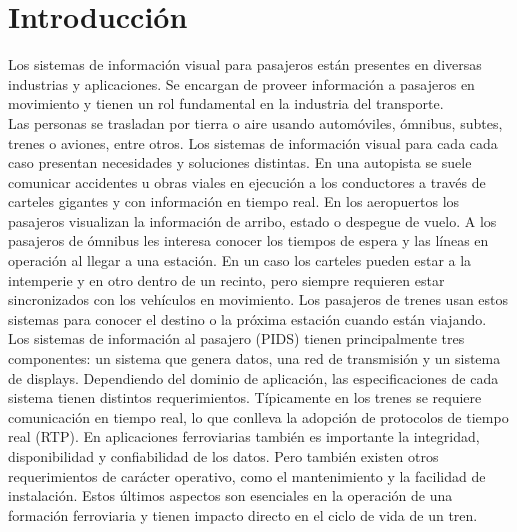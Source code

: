 
\newcommand{\keyword}[1]{\textbf{#1}}
\newcommand{\tabhead}[1]{\textbf{#1}}
\newcommand{\code}[1]{\texttt{#1}}
\newcommand{\file}[1]{\texttt{\bfseries#1}}
\newcommand{\option}[1]{\texttt{\itshape#1}}
\newcommand{\grados}{$^{\circ}$}



\chapter{Introducción} %
\label{Chapter1} %
\label{Intro}

Los sistemas de información visual para pasajeros están presentes en diversas industrias y aplicaciones. Se encargan de proveer información a pasajeros en  movimiento y tienen un rol fundamental en la industria del transporte.\\

 Las personas se trasladan por tierra o aire usando automóviles, ómnibus, subtes, trenes o aviones, entre otros. Los sistemas de información visual para cada cada caso presentan necesidades y soluciones distintas. En una autopista se suele comunicar accidentes u obras viales en ejecución a los conductores a través de carteles gigantes y con información en tiempo real. En los aeropuertos los pasajeros visualizan la información de arribo, estado o despegue de  vuelo. A los pasajeros de ómnibus les interesa conocer los tiempos de espera y las líneas en operación al llegar a una estación. En un caso los carteles pueden estar a la intemperie y en  otro dentro de un recinto, pero siempre requieren estar sincronizados con los vehículos en movimiento. Los pasajeros de trenes usan estos sistemas para conocer el destino o la próxima estación cuando están viajando. \\

Los sistemas de información al pasajero (PIDS) tienen principalmente tres componentes: un sistema que genera datos, una red de transmisión y un sistema de displays. Dependiendo del dominio de aplicación, las especificaciones de cada sistema tienen distintos requerimientos. Típicamente en los trenes se requiere comunicación en tiempo real, lo que conlleva la adopción de protocolos de tiempo real (RTP). En aplicaciones ferroviarias también es importante la integridad, disponibilidad y confiabilidad de los datos. Pero también existen otros requerimientos de carácter operativo, como el mantenimiento y la facilidad de instalación. Estos últimos aspectos son esenciales en la operación de una formación ferroviaria y tienen impacto directo en el ciclo de vida de un tren.\\

